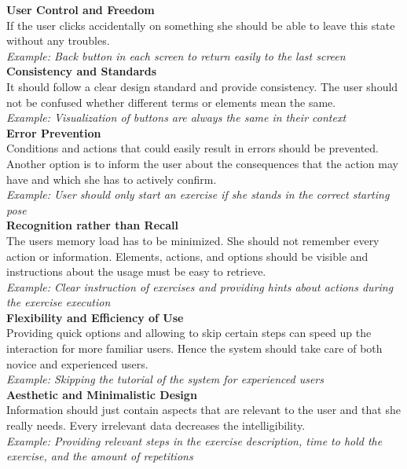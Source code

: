 \textbf{User Control and Freedom}\\
If the user clicks accidentally on something she should be able to leave this state without any troubles.\\
\textit{Example: Back button in each screen to return easily to the last screen}\\

\textbf{Consistency and Standards}\\
It should follow a clear design standard and provide consistency. The user should not be confused whether different terms or elements mean the same.\\
\textit{Example: Visualization of buttons are always the same in their context}\\

\textbf{Error Prevention}\\
Conditions and actions that could easily result in errors should be prevented. Another option is to inform the user about the consequences that the action may have and which she has to actively confirm.\\
\textit{Example: User should only start an exercise if she stands in the correct starting pose}\\

\textbf{Recognition rather than Recall}\\
The users memory load has to be minimized. She should not remember every action or information. Elements, actions, and options should be visible and instructions about the usage must be easy to retrieve.\\
\textit{Example: Clear instruction of exercises and providing hints about actions during the exercise execution}\\

\textbf{Flexibility and Efficiency of Use}\\
Providing quick options and allowing to skip certain steps can speed up the interaction for more familiar users. Hence the system should take care of both novice and experienced users.\\
\textit{Example: Skipping the tutorial of the system for experienced users}\\

\textbf{Aesthetic and Minimalistic Design}\\
Information should just contain aspects that are relevant to the user and that she really needs. Every irrelevant data decreases the intelligibility.\\
\textit{Example: Providing relevant steps in the exercise description, time to hold the exercise, and the amount of repetitions}\\

